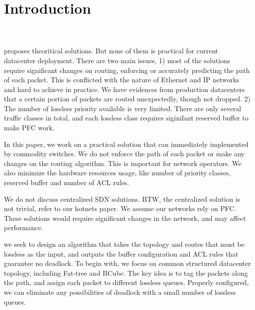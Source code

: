 \section{Introduction}\label{sec:intro}

 \\ 

 \\

 proposes theoritical solutions. But none of them is practical for current datacenter deployment.
There are two main issues, 1) most of the solutions require significant changes on routing, enforcing or accurately predicting
the path of each packet. This is conflicted with the nature of Ethernet and IP networks and hard to achieve in practice.
We have evidences from production datacenters that a certain portion of packets are routed unexpectedly, though not dropped.
2) The number of lossless priority available is very limited. There are only several traffic classes in total,
and each lossless class requires siginifant reserved buffer to make PFC work. 

 In this paper, we work on a practical solution that can immediately implemented by 
commodity switches. We do not enforce the path of each packet or make any changes on the routing algorithm. 
This is important for network operators. We also minimize the hardware resources usage, like number of priority
classes, reserved buffer and number of ACL rules.

 We do not discuss centralized SDN solutions. BTW, the centralized solution is not trivial, refer
to our hotnets paper. We assume our networks rely on PFC. These solutions would require significant changes 
in the network, and may affect performance.

 we seek to design an algorithm that takes the topology and routes that must be lossless as the 
input, and outputs the buffer configuration and ACL rules that guarantee no deadlock. To begin with, we focus on 
common structured datacenter topology, including Fat-tree and BCube. The key idea is to tag the packets along 
the path, and assign each packet to different lossless queues. Properly configured, we can eliminate any
possibilities of deadlock with a small number of lossless queues.

